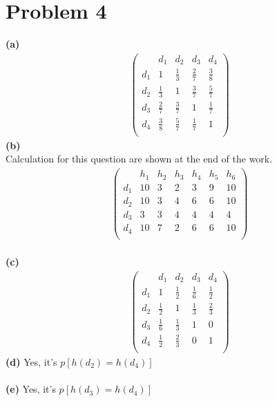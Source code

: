 \documentclass[11pt]{scrartcl}
\begin{document}
 \section*{Problem 4}
 \textbf{(a)}
 \begin{equation*}
\begin{aligned}
\begin{pmatrix}
&d_1&d_2&d_3&d_4\\
d_1 & 1 &\frac{1}{3} & \frac{2}{7}&\frac{3}{8}\\
d_2 & \frac{1}{3} & 1 & \frac{3}{7}&\frac{5}{7}\\
d_3 & \frac{2}{7} &\frac{3}{7}&1&\frac{1}{7}\\
d_4 &\frac{3}{8} &\frac{5}{7}&\frac{1}{7}& 1\\
\end{pmatrix}
\end{aligned}
\end{equation*}
\textbf{(b)}\\
Calculation for this question are shown at the end of the work.
 \begin{equation*}
\begin{aligned}
\begin{pmatrix}
         &   h_1&   h_2   &h_3   &h_4  & h_5& h_6 \\
d_1 &   10   &   3        &   2     &   3     &   9   &   10 \\
d_2 &   10   &   3        &   4     &   6     &   6   &   10 \\
d_3 &   3     &   3        &   4      &   4     &   4   &   4   \\
d_4 &   10   &   7        &   2     &   6      &   6   &   10 \\
\end{pmatrix}
\end{aligned}
\end{equation*}
\\
\textbf{(c)}
 \begin{equation*}
\begin{aligned}
\begin{pmatrix}
          & d_1              & d_2             & d_3             & d_4\\
d_1  & 1                  &\frac{1}{2} &\frac{1}{6} &\frac{1}{2}\\
d_2  &\frac{1}{2} &1                    &\frac{1}{3} &\frac{2}{3}\\
d_3  &\frac{1}{6} &\frac{1}{3} &1                    &0\\
d_4  &\frac{1}{2} &\frac{2}{3} &0                   &1\\
\end{pmatrix}
\end{aligned}
\end{equation*}
\textbf{(d)}
Yes, it's $p[h(d_2)=h(d_4)]$\\
\\
\textbf{(e)}
Yes, it's $p[h(d_3)=h(d_4)]$\\
\\
\end{document}
